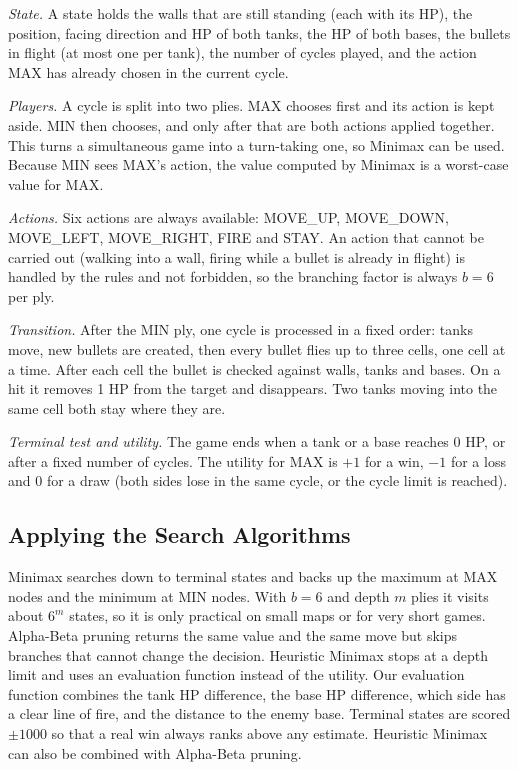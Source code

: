\documentclass[conference]{IEEEtran}
\begin{document}
\textit{State.} A state holds the walls that are still standing (each with its HP), the position,
facing direction and HP of both tanks, the HP of both bases, the bullets in flight (at most one per
tank), the number of cycles played, and the action MAX has already chosen in the current cycle.

\textit{Players.} A cycle is split into two plies. MAX chooses first and its action is kept
aside. MIN then chooses, and only after that are both actions applied together. This turns a
simultaneous game into a turn-taking one, so Minimax can be used. Because MIN sees MAX's action,
the value computed by Minimax is a worst-case value for MAX.

\textit{Actions.} Six actions are always available: MOVE\_UP, MOVE\_DOWN, MOVE\_LEFT, MOVE\_RIGHT,
FIRE and STAY. An action that cannot be carried out (walking into a wall, firing while a bullet is
already in flight) is handled by the rules and not forbidden, so the branching factor is always
$b=6$ per ply.

\textit{Transition.} After the MIN ply, one cycle is processed in a fixed order: tanks move, new
bullets are created, then every bullet flies up to three cells, one cell at a time. After each cell
the bullet is checked against walls, tanks and bases. On a hit it removes 1 HP from the target and
disappears. Two tanks moving into the same cell both stay where they are.

\textit{Terminal test and utility.} The game ends when a tank or a base reaches 0 HP, or after a
fixed number of cycles. The utility for MAX is $+1$ for a win, $-1$ for a loss and $0$ for a draw
(both sides lose in the same cycle, or the cycle limit is reached).

\subsection{Applying the Search Algorithms}
Minimax searches down to terminal states and backs up the maximum at MAX nodes and the minimum at
MIN nodes. With $b=6$ and depth $m$ plies it visits about $6^m$ states, so it is only practical on
small maps or for very short games. Alpha-Beta pruning returns the same value and the same move but
skips branches that cannot change the decision. Heuristic Minimax stops at a depth limit and uses an
evaluation function instead of the utility. Our evaluation function combines the tank HP
difference, the base HP difference, which side has a clear line of fire, and the distance to the
enemy base. Terminal states are scored $\pm 1000$ so that a real win always ranks above any
estimate. Heuristic Minimax can also be combined with Alpha-Beta pruning.
\end{document}

